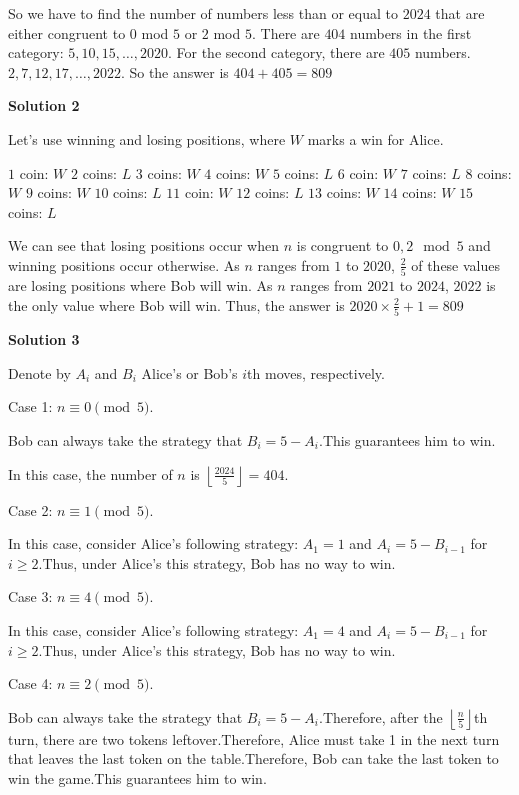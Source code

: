 \begin{enumerate}
 So we have to find the number of numbers less than or equal to $2024$ that are either congruent to $0$ mod $5$ or $2$ mod $5$. There are $404$ numbers in the first category: $5, 10, 15, \dots, 2020$. For the second category, there are $405$ numbers. $2, 7, 12, 17, \dots, 2022$. So the answer is $404 + 405 = \boxed{809}$




\textbf{Solution 2}

Let's use winning and losing positions, where $W$ marks a win for Alice.

 $1$ coin: $W$
$2$ coins: $L$
$3$ coins: $W$
$4$ coins: $W$
$5$ coins: $L$
$6$ coin: $W$
$7$ coins: $L$
$8$ coins: $W$
$9$ coins: $W$
$10$ coins: $L$
$11$ coin: $W$
$12$ coins: $L$
$13$ coins: $W$
$14$ coins: $W$
$15$ coins: $L$

 We can see that losing positions occur when $n$ is congruent to $0, 2 \mod{5}$ and winning positions occur otherwise. As $n$ ranges from $1$ to $2020$, $\frac{2}{5}$ of these values are losing positions where Bob will win. As $n$ ranges from $2021$ to $2024$, $2022$ is the only value where Bob will win. Thus, the answer is $2020\times\frac{2}{5}+1=\boxed{809}$




\textbf{Solution 3}

Denote by $A_i$ and $B_i$ Alice's or Bob's $i$th moves, respectively.

 Case 1: $n \equiv 0 \pmod{5}$.

 Bob can always take the strategy that $B_i = 5 - A_i$.This guarantees him to win.

 In this case, the number of $n$ is $\left\lfloor \frac{2024}{5} \right\rfloor = 404$.

 Case 2: $n \equiv 1 \pmod{5}$.

 In this case, consider Alice's following strategy: $A_1 = 1$ and $A_i = 5 - B_{i-1}$ for $i \geq 2$.Thus, under Alice's this strategy, Bob has no way to win.

 Case 3: $n \equiv 4 \pmod{5}$.

 In this case, consider Alice's following strategy: $A_1 = 4$ and $A_i = 5 - B_{i-1}$ for $i \geq 2$.Thus, under Alice's this strategy, Bob has no way to win.

 Case 4: $n \equiv 2 \pmod{5}$.

 Bob can always take the strategy that $B_i = 5 - A_i$.Therefore, after the $\left\lfloor \frac{n}{5} \right\rfloor$th turn, there are two tokens leftover.Therefore, Alice must take 1 in the next turn that leaves the last token on the table.Therefore, Bob can take the last token to win the game.This guarantees him to win.


\end{enumerate}

